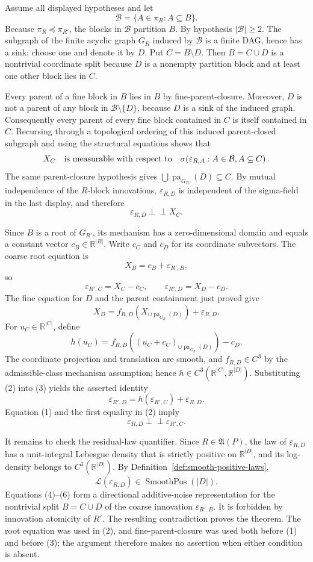 Assume all displayed hypotheses and let
\[
 \mathcal B=\{A\in\pi_R:A\subseteq B\}.
\]
Because \(\pi_R\preceq\pi_{R'}\), the blocks in \(\mathcal B\) partition
\(B\).  By hypothesis \(|\mathcal B|\geq2\).  The subgraph of the finite
acyclic graph \(G_R\) induced by \(\mathcal B\) is a finite DAG, hence has a
sink; choose one and denote it by \(D\).  Put \(C=B\setminus D\).  Then
\(B=C\mathbin{\dot\cup}D\) is a nontrivial coordinate split because \(D\) is
a nonempty partition block and at least one other block lies in \(C\).

Every parent of a fine block in \(B\) lies in \(B\) by fine-parent-closure.
Moreover, \(D\) is not a parent of any block in \(\mathcal B\setminus\{D\}\),
because \(D\) is a sink of the induced graph.  Consequently every parent of
every fine block contained in \(C\) is itself contained in \(C\).  Recursing
through a topological ordering of this induced parent-closed subgraph and using
the structural equations shows that
\[
 X_C\quad\hbox{is measurable with respect to}\quad
 \sigma\!\left(\varepsilon_{R,A}:A\in\mathcal B, A\subseteq C\right).
\]
The same parent-closure hypothesis gives
\(\bigcup\operatorname{pa}_{G_R}(D)\subseteq C\).  By mutual independence of
the \(R\)-block innovations,
\(\varepsilon_{R,D}\) is independent of the sigma-field in the last display,
and therefore
\[
 \varepsilon_{R,D}\perp\!\!\!\perp X_C. \tag{1}
\]

Since \(B\) is a root of \(G_{R'}\), its mechanism has a zero-dimensional
domain and equals a constant vector \(c_B\in\mathbb R^{|B|}\).  Write
\(c_C\) and \(c_D\) for its coordinate subvectors.  The coarse root equation
is
\[
 X_B=c_B+\varepsilon_{R',B},
\]
so
\[
 \varepsilon_{R',C}=X_C-c_C,
 \qquad
 \varepsilon_{R',D}=X_D-c_D. \tag{2}
\]
The fine equation for \(D\) and the parent containment just proved give
\[
 X_D=f_{R,D}\!\left(X_{\cup\operatorname{pa}_{G_R}(D)}\right)
       +\varepsilon_{R,D}. \tag{3}
\]
For \(u_C\in\mathbb R^{|C|}\), define
\[
 h(u_C)=
 f_{R,D}\!\left((u_C+c_C)_{\cup\operatorname{pa}_{G_R}(D)}\right)-c_D.
\]
The coordinate projection and translation are smooth, and
\(f_{R,D}\in C^3\) by the admissible-class mechanism assumption; hence
\(h\in C^3(\mathbb R^{|C|},\mathbb R^{|D|})\).  Substituting (2) into (3)
yields the asserted identity
\[
 \varepsilon_{R',D}
 =h(\varepsilon_{R',C})+\varepsilon_{R,D}. \tag{4}
\]
Equation (1) and the first equality in (2) imply
\[
 \varepsilon_{R,D}\perp\!\!\!\perp\varepsilon_{R',C}. \tag{5}
\]

It remains to check the residual-law quantifier.  Since \(R\in\mathfrak A(P)\),
the law of \(\varepsilon_{R,D}\) has a unit-integral Lebesgue density that is
strictly positive on \(\mathbb R^{|D|}\), and its log-density belongs to
\(C^3(\mathbb R^{|D|})\).  By
Definition~\ref{def:smooth-positive-laws},
\[
 \mathcal L(\varepsilon_{R,D})\in\operatorname{SmoothPos}(|D|). \tag{6}
\]
Equations (4)--(6) form a directional additive-noise representation for the
nontrivial split \(B=C\mathbin{\dot\cup}D\) of the coarse innovation
\(\varepsilon_{R',B}\).  It is forbidden by innovation atomicity of \(R'\).
The resulting contradiction proves the theorem.  The root equation was used
in (2), and fine-parent-closure was used both before (1) and before (3); the
argument therefore makes no assertion when either condition is absent.